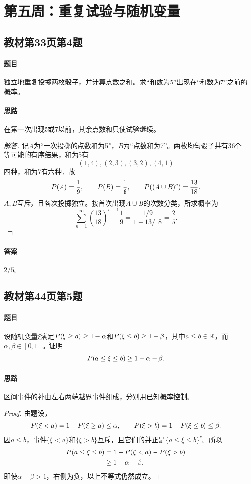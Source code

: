 \section{第五周：重复试验与随机变量}

\subsection{教材第33页第4题}
\label{ex:w05-t33-4}
\paragraph{题目}
独立地重复投掷两枚骰子，并计算点数之和。求“和数为5”出现在“和数为7”之前的概率。
\paragraph{思路}在第一次出现5或7以前，其余点数和只使试验继续。
\begin{proof}[解答]
记$A$为“一次投掷的点数和为5”，$B$为“点数和为7”。两枚均匀骰子共有36个等可能的有序结果，和为5有
\[
(1,4),(2,3),(3,2),(4,1)
\]
四种，和为7有六种，故
\[
\P(A)=\frac19,\qquad \P(B)=\frac16,\qquad
\P((A\cup B)^c)=\frac{13}{18}.
\]
$A,B$互斥，且各次投掷独立。按首次出现$A\cup B$的次数分类，所求概率为
\[
\sum_{n=1}^\infty\left(\frac{13}{18}\right)^{n-1}\frac19
=\frac{1/9}{1-13/18}=\frac25.
\]
\end{proof}
\paragraph{答案}$2/5$。

\subsection{教材第44页第5题}
\label{ex:w05-t44-5}
\paragraph{题目}
设随机变量$\xi$满足$\P(\xi\geq a)\geq1-\alpha$和$\P(\xi\leq b)\geq1-\beta$，其中$a\leq b\in\R$，而$\alpha,\beta\in[0,1]$。证明
\[
\P(a\leq\xi\leq b)\geq1-\alpha-\beta.
\]
\paragraph{思路}区间事件的补由左右两端越界事件组成，分别用已知概率控制。
\begin{proof}
由题设，
\[
\P(\xi<a)=1-\P(\xi\geq a)\leq\alpha,
\qquad
\P(\xi>b)=1-\P(\xi\leq b)\leq\beta.
\]
因$a\leq b$，事件$\{\xi<a\}$和$\{\xi>b\}$互斥，且它们的并正是$\{a\leq\xi\leq b\}^c$。所以
\begin{align*}
\P(a\leq\xi\leq b)
&=1-\P(\xi<a)-\P(\xi>b)\\
&\geq1-\alpha-\beta.
\end{align*}
即使$\alpha+\beta>1$，右侧为负，以上不等式仍然成立。
\end{proof}

